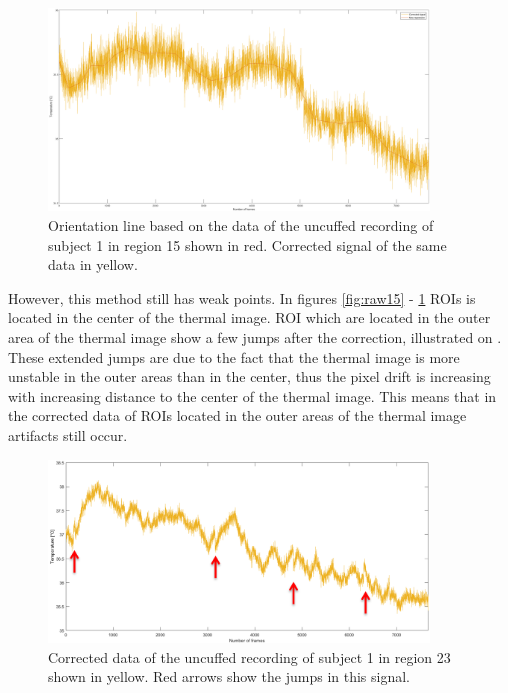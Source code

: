 \begin{figure}[H]
	\includegraphics[width=0.9\textwidth]{figures/corr15}
	\caption{Orientation line based on the data of the uncuffed recording of subject 1 in region 15 shown in red. Corrected signal of the same data in yellow.}
	\label{fig:corr15}
\end{figure}
However, this method still has weak points. In figures \ref{fig:raw15} - \ref{fig:corr15} ROIs is located in the center of the thermal image. ROI which are located in the outer area of the thermal image show a few jumps after the correction, illustrated on . These extended jumps are due to the fact that the thermal image is more unstable in the outer areas than in the center, thus the pixel drift is increasing with increasing distance to the center of the thermal image\cite{olbrycht2015}. This means that in the corrected data of ROIs located in the outer areas of the thermal image artifacts still occur. 
\begin{figure}[H]
	\includegraphics[width=0.9\textwidth]{figures/corr23pfeile}
	\caption{Corrected data of the uncuffed recording of subject 1 in region 23 shown in yellow. Red arrows show the jumps in this signal.}
	\label{fig:corr23}
\end{figure}